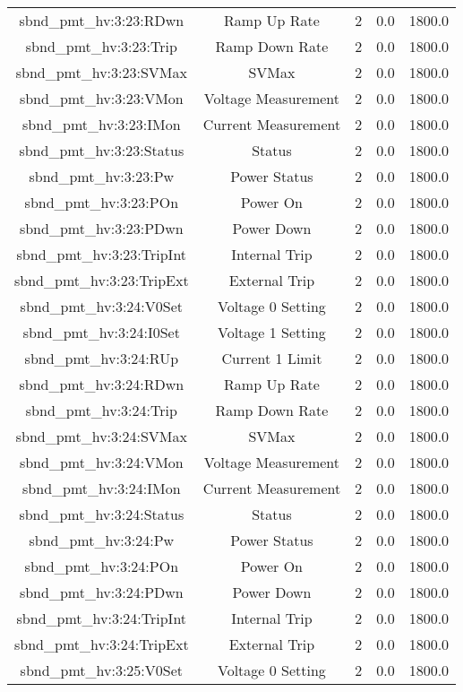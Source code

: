 \begin{center}
\begin{longtable}{c | c c c c }
sbnd\_pmt\_hv:3:23:RDwn & Ramp Up Rate & 2 & 0.0 & 1800.0\\ 
sbnd\_pmt\_hv:3:23:Trip & Ramp Down Rate & 2 & 0.0 & 1800.0\\ 
sbnd\_pmt\_hv:3:23:SVMax & SVMax & 2 & 0.0 & 1800.0\\ 
sbnd\_pmt\_hv:3:23:VMon & Voltage Measurement & 2 & 0.0 & 1800.0\\ 
sbnd\_pmt\_hv:3:23:IMon & Current Measurement & 2 & 0.0 & 1800.0\\ 
sbnd\_pmt\_hv:3:23:Status & Status & 2 & 0.0 & 1800.0\\ 
sbnd\_pmt\_hv:3:23:Pw & Power Status & 2 & 0.0 & 1800.0\\ 
sbnd\_pmt\_hv:3:23:POn & Power On & 2 & 0.0 & 1800.0\\ 
sbnd\_pmt\_hv:3:23:PDwn & Power Down & 2 & 0.0 & 1800.0\\ 
sbnd\_pmt\_hv:3:23:TripInt & Internal Trip & 2 & 0.0 & 1800.0\\ 
sbnd\_pmt\_hv:3:23:TripExt & External Trip & 2 & 0.0 & 1800.0\\ 
sbnd\_pmt\_hv:3:24:V0Set & Voltage 0 Setting & 2 & 0.0 & 1800.0\\ 
sbnd\_pmt\_hv:3:24:I0Set & Voltage 1 Setting & 2 & 0.0 & 1800.0\\ 
sbnd\_pmt\_hv:3:24:RUp & Current 1 Limit & 2 & 0.0 & 1800.0\\ 
sbnd\_pmt\_hv:3:24:RDwn & Ramp Up Rate & 2 & 0.0 & 1800.0\\ 
sbnd\_pmt\_hv:3:24:Trip & Ramp Down Rate & 2 & 0.0 & 1800.0\\ 
sbnd\_pmt\_hv:3:24:SVMax & SVMax & 2 & 0.0 & 1800.0\\ 
sbnd\_pmt\_hv:3:24:VMon & Voltage Measurement & 2 & 0.0 & 1800.0\\ 
sbnd\_pmt\_hv:3:24:IMon & Current Measurement & 2 & 0.0 & 1800.0\\ 
sbnd\_pmt\_hv:3:24:Status & Status & 2 & 0.0 & 1800.0\\ 
sbnd\_pmt\_hv:3:24:Pw & Power Status & 2 & 0.0 & 1800.0\\ 
sbnd\_pmt\_hv:3:24:POn & Power On & 2 & 0.0 & 1800.0\\ 
sbnd\_pmt\_hv:3:24:PDwn & Power Down & 2 & 0.0 & 1800.0\\ 
sbnd\_pmt\_hv:3:24:TripInt & Internal Trip & 2 & 0.0 & 1800.0\\ 
sbnd\_pmt\_hv:3:24:TripExt & External Trip & 2 & 0.0 & 1800.0\\ 
sbnd\_pmt\_hv:3:25:V0Set & Voltage 0 Setting & 2 & 0.0 & 1800.0\\ 

\end{longtable}
\end{center}
